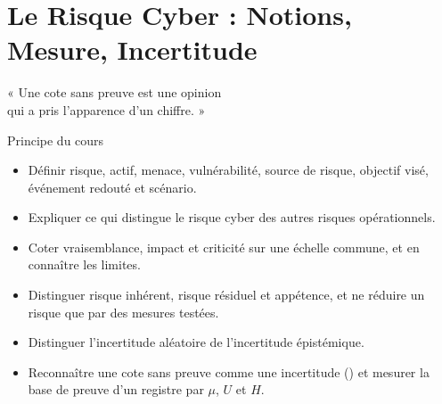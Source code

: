 
\chapter{Le Risque Cyber : Notions, Mesure, Incertitude}
\label{chap:risque}

\epigraph{%
    « Une cote sans preuve est une opinion\\
    qui a pris l'apparence d'un chiffre. »%
}{Principe du cours}


\begin{boxobjectifs}
\begin{itemize}
    \item Définir risque, actif, menace, vulnérabilité, source de risque,
          objectif visé, événement redouté et scénario.
    \item Expliquer ce qui distingue le risque cyber des autres risques
          opérationnels.
    \item Coter vraisemblance, impact et criticité sur une échelle commune,
          et en connaître les limites.
    \item Distinguer risque inhérent, risque résiduel et appétence, et ne
          réduire un risque que par des mesures testées.
    \item Distinguer l'incertitude aléatoire de l'incertitude épistémique.
    \item Reconnaître une cote sans preuve comme une incertitude (\NEK{}) et
          mesurer la base de preuve d'un registre par $\mu$, $U$ et $H$.
\end{itemize}
\end{boxobjectifs}

